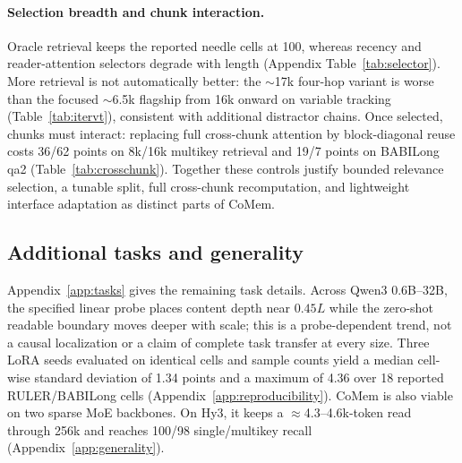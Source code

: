 \paragraph{Selection breadth and chunk interaction.}


Oracle retrieval keeps the reported needle cells at 100, whereas recency and
reader-attention selectors degrade with length (Appendix
Table~\ref{tab:selector}). More retrieval is not automatically better: the
$\sim$17k four-hop variant is worse than the focused $\sim$6.5k flagship from
16k onward on variable tracking (Table~\ref{tab:itervt}), consistent with
additional distractor chains. Once selected, chunks must interact: replacing
full cross-chunk attention by block-diagonal reuse costs 36/62 points on
8k/16k multikey retrieval and 19/7 points on BABILong qa2
(Table~\ref{tab:crosschunk}). Together these controls justify bounded relevance
selection, a tunable split, full cross-chunk recomputation, and lightweight
interface adaptation as distinct parts of CoMem.

\subsection{Additional tasks and generality}
Appendix~\ref{app:tasks} gives the remaining task details. Across Qwen3
0.6B--32B, the specified linear probe places content depth near $0.45L$ while
the zero-shot readable boundary moves deeper with scale; this is a
probe-dependent trend, not a causal localization or a claim of complete task
transfer at every size. Three LoRA seeds evaluated on identical cells and sample counts yield a
median cell-wise standard deviation of 1.34 points and a maximum of 4.36 over 18
reported RULER/BABILong cells (Appendix~\ref{app:reproducibility}). CoMem is also viable on two sparse MoE
backbones. On Hy3, it keeps a $\approx$4.3--4.6k-token read through 256k and
reaches 100/98 single/multikey recall (Appendix~\ref{app:generality}).
